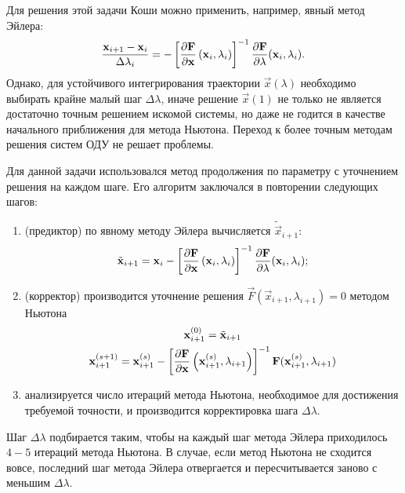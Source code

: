 Для решения этой задачи Коши можно применить, например, явный метод Эйлера:
\[
\frac{\boldsymbol{\mathbf{x}}_{i+1} - \boldsymbol{\mathbf{x}}_i}{\Delta \lambda_i} = -\left[\frac{\partial \boldsymbol{\mathbf{F}}}{\partial \boldsymbol{\mathbf{x}}}\left(\boldsymbol{\mathbf{x}}_i, \lambda_i\right)\right]^{-1} \frac{\partial \boldsymbol{\mathbf{F}}}{\partial \lambda}(\boldsymbol{\mathbf{x}}_i, \lambda_i).
\]
Однако, для устойчивого интегрирования траектории $\vec x(\lambda)$ необходимо выбирать крайне малый шаг $\Delta \lambda$, иначе решение $\vec x(1)$ не только не является достаточно точным решением искомой системы, но даже не годится в качестве начального приближения для метода Ньютона. Переход к более точным методам решения систем ОДУ не решает проблемы.

Для данной задачи использовался метод продолжения по параметру с уточнением решения на каждом шаге. Его алгоритм заключался в повторении следующих шагов:
\begin{enumerate}
\item (предиктор) по явному методу Эйлера вычисляется $\tilde {\vec x}_{i+1}$:
\[
\tilde {\boldsymbol{\mathbf{x}}}_{i+1} = \boldsymbol{\mathbf{x}}_i -\left[\frac{\partial \boldsymbol{\mathbf{F}}}{\partial \boldsymbol{\mathbf{x}}}\left(\boldsymbol{\mathbf{x}}_i, \lambda_i\right)\right]^{-1} \frac{\partial \boldsymbol{\mathbf{F}}}{\partial \lambda}(\boldsymbol{\mathbf{x}}_i, \lambda_i);
\]
\item (корректор) производится уточнение решения $\vec F(\vec x_{i+1}, \lambda_{i+1}) = 0$ методом Ньютона
\begin{gather*}
\boldsymbol{\mathbf{x}}_{i+1}^{(0)} = \tilde {\boldsymbol{\mathbf{x}}}_{i+1}\\
\boldsymbol{\mathbf{x}}_{i+1}^{(s+1)} = \boldsymbol{\mathbf{x}}_{i+1}^{(s)} - \left[\frac{\partial \boldsymbol{\mathbf{F}}}{\partial \boldsymbol{\mathbf{x}}}\left( \boldsymbol{\mathbf{x}}_{i+1}^{(s)} , \lambda_{i+1}\right)\right]^{-1} \boldsymbol{\mathbf{F}}( \boldsymbol{\mathbf{x}}_{i+1}^{(s)} , \lambda_{i+1})\\
\end{gather*}
\item анализируется число итераций метода Ньютона, необходимое для достижения требуемой точности, и производится корректировка шага $\Delta \lambda$.
\end{enumerate}
Шаг $\Delta \lambda$ подбирается таким, чтобы на каждый шаг метода Эйлера приходилось $4-5$ итераций метода Ньютона. В случае, если метод Ньютона не сходится вовсе, последний шаг метода Эйлера отвергается и пересчитывается заново с меньшим $\Delta \lambda$.

